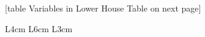 

\begin{center}
[table Variables in Lower House Table on next page]
\end{center}
\newpage

\begin{center}
\begin{longtable}{L{4cm} L{6cm} L{3cm}}
\caption{Variables in Lower House Table\label{tab_lower_house}}


\end{longtable}
\end{center}
%